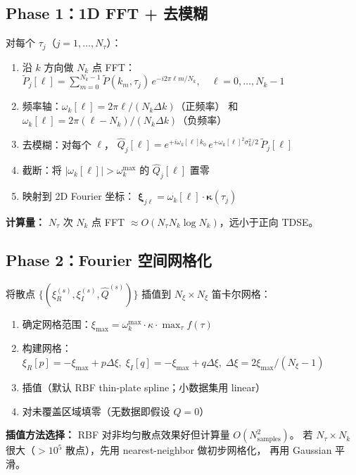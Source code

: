 \documentclass[11pt,a4paper]{ctexart}
\begin{document}
\subsection{Phase 1：1D FFT + 去模糊}

对每个 $\tau_j$（$j=1,\ldots,N_\tau$）：

\begin{enumerate}
    \item 沿 $k$ 方向做 $N_k$ 点 FFT：
        $\tilde{P}_j[\ell] = \sum_{m=0}^{N_k-1} \tilde{P}(k_m,\tau_j)\,
        e^{-i 2\pi \ell m / N_k},\quad \ell = 0,\ldots,N_k-1$
    \item 频率轴：$\omega_k[\ell] = 2\pi\ell/(N_k\Delta k)$（正频率）
        和 $\omega_k[\ell] = 2\pi(\ell - N_k)/(N_k\Delta k)$（负频率）
    \item 去模糊：对每个 $\ell$，
        $\hat{Q}_j[\ell] = e^{+i\omega_k[\ell] k_0}\,
        e^{+\omega_k[\ell]^2\sigma_k^2/2}\, \tilde{P}_j[\ell]$
    \item 截断：将 $|\omega_k[\ell]| > \omega_k^{\max}$ 的 $\hat{Q}_j[\ell]$ 置零
    \item 映射到 2D Fourier 坐标：
        $\boldsymbol{\xi}_{j\ell} = \omega_k[\ell] \cdot \boldsymbol{\kappa}(\tau_j)$
\end{enumerate}

\textbf{计算量：} $N_\tau$ 次 $N_k$ 点 FFT $\approx O(N_\tau N_k \log N_k)$，远小于正向 TDSE。

\subsection{Phase 2：Fourier 空间网格化}

将散点 $\{(\xi_R^{(s)}, \xi_I^{(s)}, \hat{Q}^{(s)})\}$ 插值到 $N_\xi \times N_\xi$ 笛卡尔网格：

\begin{enumerate}
    \item 确定网格范围：$\xi_{\max} = \omega_k^{\max} \cdot \kappa \cdot
        \max_\tau f(\tau)$
    \item 构建网格：$\xi_R[p] = -\xi_{\max} + p\Delta\xi,\;
        \xi_I[q] = -\xi_{\max} + q\Delta\xi,\;
        \Delta\xi = 2\xi_{\max}/(N_\xi-1)$
    \item 插值（默认 RBF thin-plate spline；小数据集用 linear）
    \item 对未覆盖区域填零（无数据即假设 $\hat{Q}=0$）
\end{enumerate}

\begin{warnbox}
\textbf{插值方法选择：} RBF 对非均匀散点效果好但计算量 $O(N_{\text{samples}}^2)$。
若 $N_\tau \times N_k$ 很大（$>10^5$ 散点），先用 nearest-neighbor 做初步网格化，
再用 Gaussian 平滑。
\end{warnbox}
\end{document}
